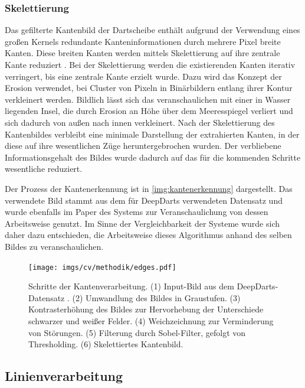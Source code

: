 \subsubsection{Skelettierung}
\label{sec:skelettierung}

Das gefilterte Kantenbild der Dartscheibe enthält aufgrund der Verwendung eines großen Kernels redundante Kanteninformationen durch mehrere Pixel breite Kanten. Diese breiten Kanten werden mittels Skelettierung auf ihre zentrale Kante reduziert \cite{skeletonization}. Bei der Skelettierung werden die existierenden Kanten iterativ verringert, bis eine zentrale Kante erzielt wurde. Dazu wird das Konzept der Erosion verwendet, bei Cluster von Pixeln in Binärbildern entlang ihrer Kontur verkleinert werden. Bildlich lässt sich das veranschaulichen mit einer in Wasser liegenden Insel, die durch Erosion an Höhe über dem Meeresspiegel verliert und sich dadurch von außen nach innen verkleinert. Nach der Skelettierung des Kantenbildes verbleibt eine minimale Darstellung der extrahierten Kanten, in der diese auf ihre wesentlichen Züge heruntergebrochen wurden. Der verbliebene Informationsgehalt des Bildes wurde dadurch auf das für die kommenden Schritte wesentliche reduziert.

Der Prozess der Kantenerkennung ist in \autoref{img:kantenerkennung} dargestellt. Das verwendete Bild stammt aus dem für DeepDarts verwendeten Datensatz und wurde ebenfalls im Paper des Systems zur Veranschaulichung von dessen Arbeitsweise genutzt. Im Sinne der Vergleichbarkeit der Systeme wurde sich daher dazu entschieden, die Arbeitsweise dieses Algorithmus anhand des selben Bildes zu veranschaulichen.

\begin{figure}
    \centering
    \texttt{[image: imgs/cv/methodik/edges.pdf]}
    \caption{Schritte der Kantenverarbeitung. (1) Input-Bild aus dem DeepDarts-Datensatz \cite{deepdarts-data}. (2) Umwandlung des Bildes in Graustufen. (3) Kontrasterhöhung des Bildes zur Hervorhebung der Unterschiede schwarzer und weißer Felder. (4) Weichzeichnung zur Verminderung von Störungen. (5) Filterung durch Sobel-Filter, gefolgt von Thresholding. (6) Skelettiertes Kantenbild.}
    \label{img:kantenerkennung}
\end{figure}


\subsection{Linienverarbeitung}
\label{sec:linien}

